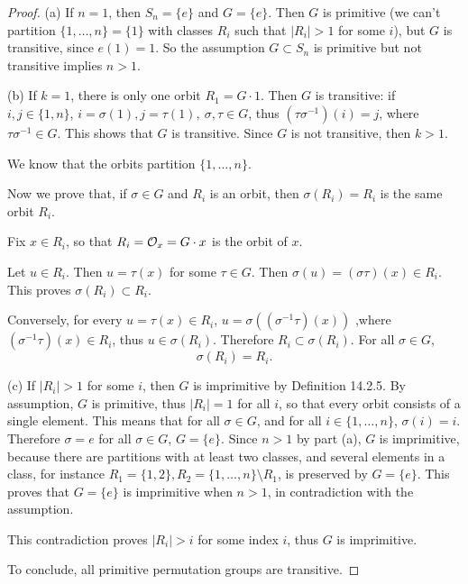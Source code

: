 \documentclass[11pt,a4paper]{article}
\begin{document}
 \begin{proof}

 \item[(a)] If $n = 1$, then $S_n=\{e\}$ and $G = \{e\}$. Then $G$ is primitive (we can't partition $\{1,\ldots,n\} = \{1\}$ with classes $R_i$ such that $|R_i|>1$ for some $i$), but $G$ is transitive, since $e(1) = 1$. So the assumption $G \subset S_n$ is primitive but not transitive implies $n>1$.
 \item[(b)] If $k=1$, there is only one orbit $R_1 = G\cdot 1$. Then $G$ is transitive: if $i,j \in \{1,n\}$, $i = \sigma(1), j = \tau(1),\ \sigma, \tau \in G$, thus $(\tau \sigma^{-1})(i) = j$, where $\tau \sigma^{-1} \in G$. This shows that $G$ is transitive. Since $G$ is not transitive, then $k>1$.
 

 We know that the orbits partition $\{1,\ldots,n\}$. 
  
 Now we prove that, if $\sigma \in G$ and $R_i$ is an orbit, then $\sigma(R_i) = R_i$ is the same orbit $R_i$.
 
 Fix $x \in R_i$, so that $R_i = {\cal O}_x = G\cdot x$ is the orbit of $x$.
 
 Let $u \in R_i$. Then  $u = \tau(x)$ for some $\tau \in G$. Then $\sigma(u) = (\sigma \tau)(x) \in R_i$. This proves $\sigma(R_i) \subset R_i$.
 
 Conversely, for every $u = \tau(x) \in R_i$, $ u = \sigma((\sigma^{-1} \tau)(x))$ ,where $(\sigma^{-1} \tau)(x) \in R_i$, thus $u \in \sigma(R_i)$. Therefore $R_i \subset \sigma(R_i)$. For all $\sigma \in G$,
 $$\sigma(R_i) = R_i.$$
 
 \item[(c)] If $|R_i|>1$ for some $i$, then $G$ is imprimitive by Definition 14.2.5. By assumption, $G$ is primitive, thus $|R_i| = 1$ for all $i$, so that every orbit consists of a single element. This means that for all $\sigma \in G$, and for all $i \in \{1,\ldots,n\}$, $\sigma(i) = i$. Therefore $\sigma = e$ for all $\sigma \in G$, $G = \{e\}$. Since $n>1$ by part (a), 
 $G$ is imprimitive, because there are partitions with at least two classes, and several elements in a class, for instance $R_1 = \{1,2\},R_2 =\{1,\ldots,n\} \setminus R_1$, is preserved by $G = \{e\}$. This proves that $G = \{e\}$ is imprimitive when $n>1$, in contradiction with the assumption.
 
This contradiction proves $|R_i|>i$ for some index $i$, thus $G$ is imprimitive.
 
 To conclude, all primitive permutation groups are transitive.
 \end{proof}
 
\end{document}
